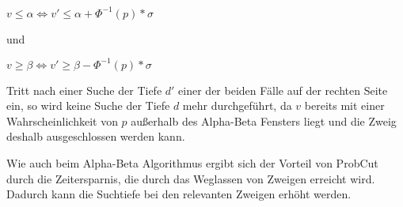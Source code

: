 \(v\leq\alpha \iff v'\leq\alpha+\Phi^{-1}(p)*\sigma\)

und

\(v\geq\beta \iff v'\geq\beta-\Phi^{-1}(p)*\sigma\)

Tritt nach einer Suche der Tiefe \(d'\) einer der beiden Fälle auf der rechten Seite ein, so wird keine Suche der Tiefe \(d\) mehr durchgeführt, da \(v\) bereits mit einer Wahrscheinlichkeit von \(p\) außerhalb des Alpha-Beta Fensters liegt
und die Zweig deshalb ausgeschlossen werden kann.

Wie auch beim Alpha-Beta Algorithmus ergibt sich der Vorteil von ProbCut durch die Zeitersparnis, die durch das Weglassen von Zweigen erreicht wird. Dadurch kann die Suchtiefe bei den relevanten Zweigen erhöht werden.
\cite[S.~1]{probcut}
